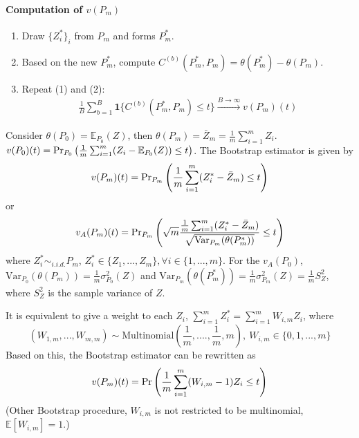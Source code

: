 \documentclass[11pt]{elegantbook}
\begin{document}
\paragraph*{Computation of $v(P_m)$}
\begin{enumerate}[(1).]
    \item Draw $\{Z_i^*\}_i$ from $P_m$ and forms $P_m^*$.
    \item Based on the new $P_m^*$, compute $C^{(b)}(P_m^*,P_m)=\theta(P_m^*)-\theta(P_m)$.
    \item Repeat (1) and (2):
    \begin{equation}
        \begin{aligned}
            \frac{1}{B}\sum_{b=1}^B \mathbf{1}\{C^{(b)}(P_m^*,P_m)\leq t\}\stackrel{B \rightarrow \infty}{\longrightarrow}v(P_m)(t)
        \end{aligned}
        \nonumber
    \end{equation}
\end{enumerate}


\begin{example}
    Consider $\theta(P_0)=\mathbb{E}_{P_0}(Z)$, then $\theta(P_m)=\bar{Z}_m=\frac{1}{m}\sum_{i=1}^m Z_i$. $v(P_0)(t)=\textnormal{Pr}_{P_0}\left(\frac{1}{m}\sum_{i=1}^m (Z_i-\mathbb{E}_{P_0}(Z))\leq t\right)$. The Bootstrap estimator is given by
    \begin{equation}
        \begin{aligned}
            v(P_m)(t)=\textnormal{Pr}_{P_m}\left(\frac{1}{m}\sum_{i=1}^m (Z_i^*-\bar{Z}_m)\leq t\right)
        \end{aligned}
        \nonumber
    \end{equation}
    or
    \begin{equation}
        \begin{aligned}
            v_A(P_m)(t)=\textnormal{Pr}_{P_m}\left(\sqrt{m}\frac{\frac{1}{m}\sum_{i=1}^m (Z_i^*-\bar{Z}_m)}{\sqrt{\text{Var}_{P_m}(\theta(P_m^*))}}\leq t\right)
        \end{aligned}
        \nonumber
    \end{equation}
    where $Z_i^*\sim_{i.i.d.} P_m$, $Z_i^*\in\{Z_1,...,Z_m\},\forall i\in\{1,...,m\}$. For the $v_A(P_0)$, $\text{Var}_{P_0}(\theta(P_m))=\frac{1}{m}\sigma^2_{P_0}(Z)$ and $\text{Var}_{P_m}(\theta(P_m^*))=\frac{1}{m}\sigma^2_{P_m}(Z)=\frac{1}{m}S^2_Z$, where $S_Z^2$ is the sample variance of $Z$.
    
    It is equivalent to give a weight to each $Z_i$, $\sum_{i=1}^m Z_i^*=\sum_{i=1}^m W_{i,m} Z_i$, where $$\left(W_{1,m},...,W_{m,m}\right)\sim\text{Multinomial}\left(\frac{1}{m},....,\frac{1}{m},m\right),\ W_{i,m}\in\{0,1,...,m\}$$
    Based on this, the Bootstrap estimator can be rewritten as
    \begin{equation}
        \begin{aligned}
            v(P_m)(t)=\textnormal{Pr}\left(\frac{1}{m}\sum_{i=1}^m (W_{i,m}-1)Z_i\leq t\right)
        \end{aligned}
        \nonumber
    \end{equation}
    (Other Bootstrap procedure, $W_{i,m}$ is not restricted to be multinomial, $\mathbb{E}[W_{i,m}]=1$.)
\end{example}
\end{document}
